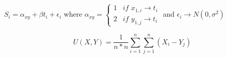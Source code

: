 \documentclass[10pt,letterpaper]{article}
\begin{document}
	$ S_i = \alpha_{x y} + \beta t_i + \epsilon_i $ where 
	$ \alpha_{x y} = \begin{cases}
		 1 & \textit{if } x_{1, i} \rightarrow t_i \\
		2 & \textit{if } y_{1, j} \rightarrow t_i 
	\end{cases} $ and $ \epsilon_i \rightarrow N(0, \sigma^2) $
	
	\vspace{5mm}
	
	\[ U(X,Y) = \dfrac{1}{n*n} \sum_{i=1}^{n}{\sum_{j=1}^{n}}{(X_i - Y_j)} \]
\end{document}
